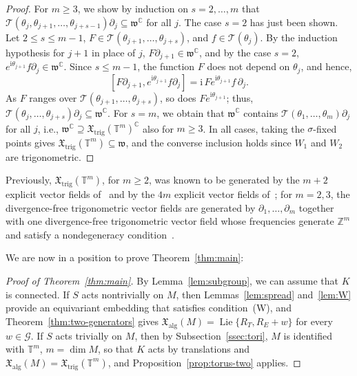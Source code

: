 \documentclass{article}
\newcommand{\C}{\mathbb{C}}
\newcommand{\Z}{\mathbb{Z}}
\newcommand{\T}{\mathbb{T}}
\newcommand{\frakw}{\mathfrak{w}}
\newcommand{\xalg}{\mathfrak X_{\mathrm{alg}}}
\newcommand{\xtrig}{\mathfrak X_{\mathrm{trig}}}
\theoremstyle{definition}
\theoremstyle{plain}
\begin{document}
\begin{proof}
For $m\geq3$, we show by induction on $s=2,\ldots,m$ that $\mathcal T(\theta_j,\theta_{j+1},\ldots,\theta_{j+s-1})\partial_j\subseteq \frakw^\C$ for all $j$.
The case $s=2$ has just been shown. Let $2\leq s\leq m-1$, $F\in\mathcal T(\theta_{j+1},\ldots,\theta_{j+s})$, and $f\in\mathcal T(\theta_j)$.
By the induction hypothesis for $j+1$ in place of $j$, $F\partial_{j+1}\in \frakw^\C$, and by the case $s=2$, $e^{\mathrm{i}\theta_{j+1}} f \partial_j\in \frakw^\C$.
Since $s\leq m-1$, the function $F$ does not depend on $\theta_j$, and hence,
$$
[F\partial_{j+1},e^{\mathrm{i}\theta_{j+1}}f\partial_j] = \mathrm{i}\,Fe^{\mathrm{i}\theta_{j+1}}f\,\partial_j.
$$
As $F$ ranges over $\mathcal T(\theta_{j+1},\ldots,\theta_{j+s})$,
  so does $Fe^{\mathrm{i}\theta_{j+1}}$; thus, $\mathcal T(\theta_j,\ldots,\theta_{j+s})\partial_j\subseteq \frakw^\C$.
 For $s=m$, we obtain that $\frakw^\C$ contains $\mathcal T(\theta_1,\ldots,\theta_m)\partial_j$ for all $j$, i.e., $\frakw^\C\supseteq \xtrig(\T^m)^\C$ also for $m\geq3$.
In all cases, taking the $\sigma$-fixed points gives $\xtrig(\T^m)\subseteq \frakw$, and the converse inclusion holds since $W_1$ and $W_2$ are trigonometric.
\end{proof}

Previously, $\xtrig(\T^m)$, for $m\geq2$, was known to be generated by the $m+2$ explicit vector fields of~\cite[Theorem~1]{Luk79} and by the $4m$ explicit vector fields of~\cite[Lemma~6.5]{AS22}; for $m=2,3$, the divergence-free trigonometric vector fields are generated by $\partial_1,\ldots,\partial_m$ together with one divergence-free trigonometric vector field whose frequencies generate $\Z^m$ and satisfy a nondegeneracy condition~\cite[Theorems~6 and~8]{AK26}.

We are now in a position to prove Theorem~\ref{thm:main}:

\begin{proof}[Proof of Theorem~\ref{thm:main}]
By Lemma~\ref{lem:subgroup}, we can assume that $K$ is connected.
If $S$ acts nontrivially on $M$, then Lemmas~\ref{lem:spread} and~\ref{lem:W} provide an equivariant embedding that satisfies condition~(W), and Theorem~\ref{thm:two-generators} gives $\xalg(M)=\operatorname{Lie}\{R_T,R_E+w\}$ for every $w\in\mathcal G$.
If $S$ acts trivially on $M$, then by Subsection~\ref{ssec:tori}, $M$ is identified with $\T^m$,
    $m=\dim M$, so that $K$ acts by translations and $\xalg(M)=\xtrig(\T^m)$, and Proposition~\ref{prop:torus-two} applies.
\end{proof}
\end{document}
